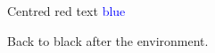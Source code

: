 \documentclass[12pt]{article}
\begin{document}
\begin{center}
\color{red} Centred red text \textcolor{blue}{blue}
\end{center}
Back to black after the environment.
\end{document}

